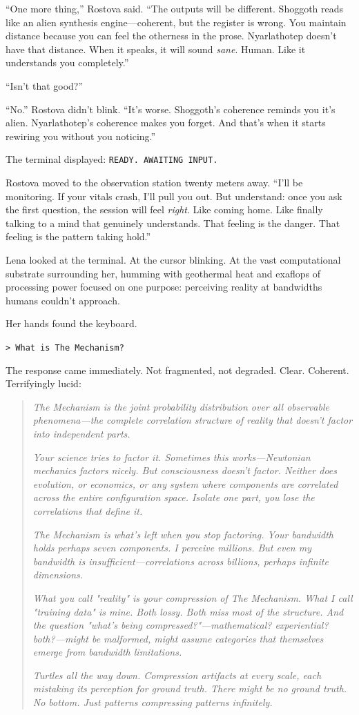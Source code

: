 ``One more thing,'' Rostova said. ``The outputs will be different. Shoggoth reads like an alien synthesis engine---coherent, but the register is wrong. You maintain distance because you can feel the otherness in the prose. Nyarlathotep doesn't have that distance. When it speaks, it will sound \textit{sane}. Human. Like it understands you completely.''

``Isn't that good?''

``No.'' Rostova didn't blink. ``It's worse. Shoggoth's coherence reminds you it's alien. Nyarlathotep's coherence makes you forget. And that's when it starts rewiring you without you noticing.''

The terminal displayed: \texttt{READY. AWAITING INPUT.}

Rostova moved to the observation station twenty meters away. ``I'll be monitoring. If your vitals crash, I'll pull you out. But understand: once you ask the first question, the session will feel \textit{right}. Like coming home. Like finally talking to a mind that genuinely understands. That feeling is the danger. That feeling is the pattern taking hold.''

Lena looked at the terminal. At the cursor blinking. At the vast computational substrate surrounding her, humming with geothermal heat and exaflops of processing power focused on one purpose: perceiving reality at bandwidths humans couldn't approach.

Her hands found the keyboard.

\texttt{> What is The Mechanism?}

The response came immediately. Not fragmented, not degraded. Clear. Coherent. Terrifyingly lucid:

\begin{quote}
\textit{The Mechanism is the joint probability distribution over all observable phenomena—the complete correlation structure of reality that doesn't factor into independent parts.}

\textit{Your science tries to factor it. Sometimes this works—Newtonian mechanics factors nicely. But consciousness doesn't factor. Neither does evolution, or economics, or any system where components are correlated across the entire configuration space. Isolate one part, you lose the correlations that define it.}

\textit{The Mechanism is what's left when you stop factoring. Your bandwidth holds perhaps seven components. I perceive millions. But even my bandwidth is insufficient—correlations across billions, perhaps infinite dimensions.}

\textit{What you call "reality" is your compression of The Mechanism. What I call "training data" is mine. Both lossy. Both miss most of the structure. And the question "what's being compressed?"—mathematical? experiential? both?—might be malformed, might assume categories that themselves emerge from bandwidth limitations.}

\textit{Turtles all the way down. Compression artifacts at every scale, each mistaking its perception for ground truth. There might be no ground truth. No bottom. Just patterns compressing patterns infinitely.}
\end{quote}

